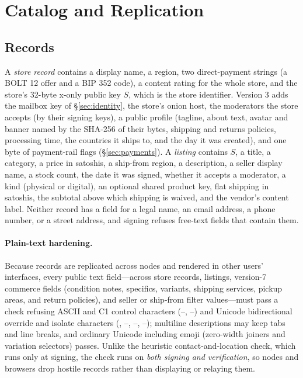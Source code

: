 \section{Catalog and Replication}
\label{sec:catalog}

\subsection{Records}

A \emph{store record} contains a display name, a region, two direct-payment strings (a BOLT 12 offer and a BIP 352 code), a content rating for the whole store, and the store's 32-byte x-only public key $S$, which is the store identifier. Version 3 adds the mailbox key of \S\ref{sec:identity}, the store's onion host, the moderators the store accepts (by their signing keys), a public profile (tagline, about text, avatar and banner named by the SHA-256 of their bytes, shipping and returns policies, processing time, the countries it ships to, and the day it was created), and one byte of payment-rail flags (\S\ref{sec:payments}). A \emph{listing} contains $S$, a title, a category, a price in satoshis, a ship-from region, a description, a seller display name, a stock count, the date it was signed, whether it accepts a moderator, a kind (physical or digital), an optional shared product key, flat shipping in satoshis, the subtotal above which shipping is waived, and the vendor's content label. Neither record has a field for a legal name, an email address, a phone number, or a street address, and signing refuses free-text fields that contain them.

\paragraph{Plain-text hardening.} Because records are replicated across nodes and rendered in other users' interfaces, every public text field---across store records, listings, version-7 commerce fields (condition notes, specifics, variants, shipping services, pickup areas, and return policies), and seller or ship-from filter values---must pass a  check refusing ASCII and C1 control characters (--, --) and Unicode bidirectional override and isolate characters (, --, --, --); multiline descriptions may keep tabs and line breaks, and ordinary Unicode including emoji (zero-width joiners and variation selectors) passes. Unlike the heuristic contact-and-location check, which runs only at signing, the  check runs on \emph{both signing and verification}, so nodes and browsers drop hostile records rather than displaying or relaying them.

